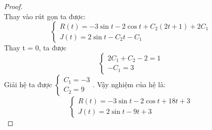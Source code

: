 \documentclass[a4paper]{article}
\begin{document}
\begin{proof}
$$$$
Thay vào rút gọn ta được: 
$$\begin{cases}
    R(t) = -3\sin{t}-2\cos{t}+ C_2(2t+1)+2C_1 \\
    J(t) = 2\sin{t} - C_2t- C_1
\end{cases}$$
Thay t = 0, ta được 
$$\begin{cases}
    2C_1 + C_2 -2 = 1\\
    -C_1 = 3
\end{cases}$$
Giải hệ ta được 
$\begin{cases}
    C_1 = -3 \\
    C_2 = 9
\end{cases}$. Vậy nghiệm của hệ là:
$$\begin{cases}
    R(t) = -3\sin{t} - 2\cos{t} + 18t + 3 \\
    J(t) = 2\sin{t} - 9t + 3 
\end{cases}$$
\end{proof}
\end{document}
